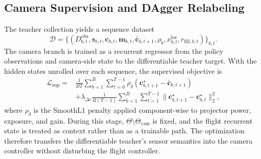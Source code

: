 \documentclass[letterpaper,journal]{IEEEtran}
\begin{document}
\subsection{Camera Supervision and DAgger Relabeling}
The teacher collection yields a sequence dataset
\begin{equation}
    \mathcal{D}=
    \{(D^{\mathrm{obs}}_{b,t},\mathbf{s}_{b,t},\mathbf{c}_{b,t},
    \mathbf{m}_{b,t},\bar{\mathbf{c}}_{b,t+1},
    \rho_b,x^{\mathrm{loc}}_{b,t},r_{\mathrm{fill},b,t})\}_{b,t}.
    \label{eq:dataset}
\end{equation}
The camera branch is trained as a recurrent regressor from the policy
observations and camera-side state to the differentiable teacher target. With
the hidden states unrolled over each sequence, the supervised objective is
\begin{equation}
\begin{aligned}
    \mathcal{L}_{\mathrm{sup}}
    ={}&\frac{1}{BT}\sum_{b=1}^{B}\sum_{t=0}^{T-1}
    \rho_{\delta}
    (\mathbf{c}_{b,t+1}^{\star}-\bar{\mathbf{c}}_{b,t+1})\\
    &+\lambda_{\Delta c}
    \frac{1}{B(T-1)}\sum_{b=1}^{B}\sum_{t=1}^{T-1}
    \|\mathbf{c}_{b,t+1}^{\star}
    -\mathbf{c}_{b,t}^{\star}\|_2^2 ,
    \label{eq:supervised_loss}
\end{aligned}
\end{equation}
where $\rho_{\delta}$ is the SmoothL1 penalty applied component-wise to
projector power, exposure, and gain. During this stage,
$\Theta\setminus\Theta_{\mathrm{cam}}$ is fixed, and the flight recurrent
state is treated as context rather than as a trainable path. The optimization
therefore transfers the differentiable teacher's sensor semantics into the
camera controller without disturbing the flight controller.
\end{document}

